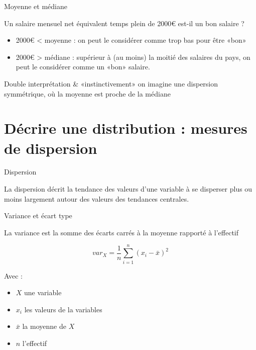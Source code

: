 \documentclass{beamer}
\begin{document}
\begin{frame}{Moyenne et médiane}

Un salaire mensuel net équivalent temps plein de 2000€ est-il un bon salaire ? 

\begin{itemize}
  \item 2000€  <  moyenne  :  on peut le considérer comme trop bas pour être «bon»
  \item 2000€ > médiane  :  supérieur à (au moins) la moitié des salaires du pays, on peut le considérer comme un «bon» salaire.
\end{itemize}

\begin{small}
Double interprétation  \& «instinctivement» on imagine une dispersion symmétrique, où la moyenne est proche de la médiane 
\end{small}


\end{frame}




\section{Décrire une distribution : mesures de \alert{dispersion}}

\begin{frame}{Dispersion}


La  \alert{dispersion} décrit  la tendance des valeurs d'une variable à se disperser plus ou moins largement autour des valeurs des tendances centrales.

\end{frame}


\begin{frame}{Variance et écart type}

La \alert{variance} est la somme des écarts carrés à la moyenne rapporté à l'effectif

$$ var_X= \frac{1}{n}\sum_{i=1}^{n}(x_i -\bar{x})^2$$

Avec :
\begin{itemize}
  \item $X$ une variable
  \item $x_i$ les valeurs de la variables
  \item $\bar{x}$ la moyenne de $X$ 
  \item $n$ l'effectif
\end{itemize}


\end{frame}
\end{document}
